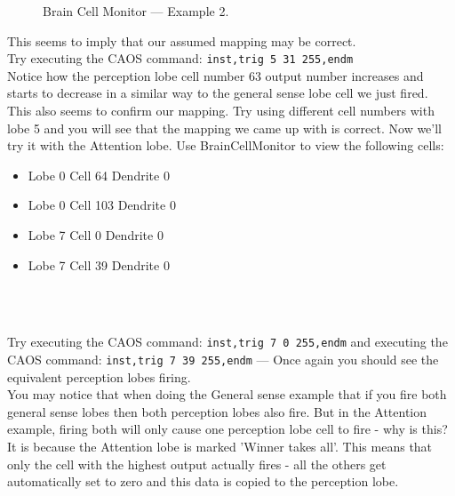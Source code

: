 \documentclass[11pt,twoside,a4paper]{article}
\begin{document}
\begin{minipage}[h]{9.75cm}
	\begin{figure}[H]
		\centerline {}
		\caption{Brain Cell Monitor --- Example 2. }
		\label{fig:perceptionLobeExample2}
	\end{figure}
\end{minipage} \hfill \begin{minipage}[h]{9.00cm}
	This seems to imply that our assumed mapping may be correct. ~\\
	
	Try executing the CAOS command: \texttt{inst,trig 5 31 255,endm} ~\\
	
	Notice how the perception lobe cell number 63 output number increases and starts to decrease in a similar way to the general sense lobe cell we just fired. This also seems to confirm our mapping. Try using different cell numbers with lobe 5 and you will see that the mapping we came up with is correct. Now we'll try it with the Attention lobe. Use BrainCellMonitor to view the following cells: %
	\begin{itemize}
		\item Lobe 0 Cell 64 Dendrite 0
		\item Lobe 0 Cell 103 Dendrite 0
		\item Lobe 7 Cell 0 Dendrite 0
		\item Lobe 7 Cell 39 Dendrite 0
	\end{itemize} ~\\
\end{minipage} ~\\ 

Try executing the CAOS command: \texttt{inst,trig 7 0 255,endm} and executing the CAOS command: \texttt{inst,trig 7 39 255,endm} --- Once again you should see the equivalent perception lobes firing. ~\\

You may notice that when doing the General sense example that if you fire both general sense lobes then both perception lobes also fire. But in the Attention example, firing both will only cause one perception lobe cell to fire - why is this? It is because the Attention lobe is marked 'Winner takes all'. This means that only the cell with the highest output actually fires - all the others get automatically set to zero and this data is copied to the perception lobe. ~\\
\end{document}
